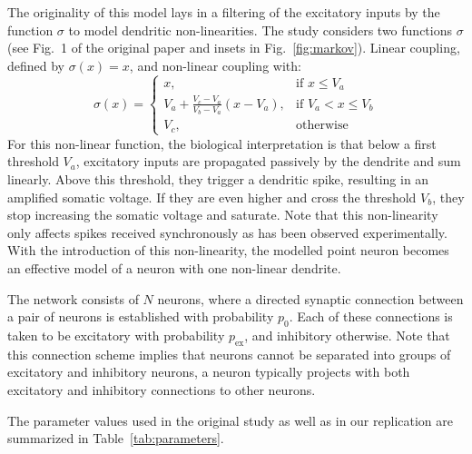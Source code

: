 \documentclass[10pt,a4paper,onecolumn]{article}
\begin{document}
The originality of this model lays in a filtering of the excitatory inputs by the function $\sigma$ to model dendritic non-linearities. The study considers two functions $\sigma$ (see Fig.~1 of the original paper and insets in Fig.~\ref{fig:markov}). Linear coupling, defined by $\sigma(x)=x$, and non-linear coupling with:
\[
    \sigma(x)= 
\begin{cases}
    x,              & \text{if } x\leq V_a\\
    V_a + \frac{V_c-V_a}{V_b-V_a} (x - V_a), & \text{if } V_a<x \leq V_b\\
    V_c,            & \text{otherwise}
\end{cases}
\]
For this non-linear function, the biological interpretation is that below a first threshold $V_a$, excitatory inputs are propagated passively by the dendrite and sum linearly. Above this threshold, they trigger a dendritic spike, resulting in an amplified somatic voltage. If they are even higher and cross the threshold $V_b$, they stop increasing the somatic voltage and saturate. Note that this non-linearity only affects spikes received synchronously as has been observed experimentally. With the introduction of this non-linearity, the modelled point neuron becomes an effective model of a neuron with one non-linear dendrite.

The network consists of $N$ neurons, where a directed synaptic connection between a pair of neurons is established with probability $p_0$. Each of these connections is taken to be excitatory with probability $p_\text{ex}$, and inhibitory otherwise. Note that this connection scheme implies that neurons cannot be separated into groups of excitatory and inhibitory neurons, a neuron typically projects with both excitatory and inhibitory connections to other neurons.

The parameter values used in the original study as well as in our replication are summarized in Table~\ref{tab:parameters}.
\end{document}
